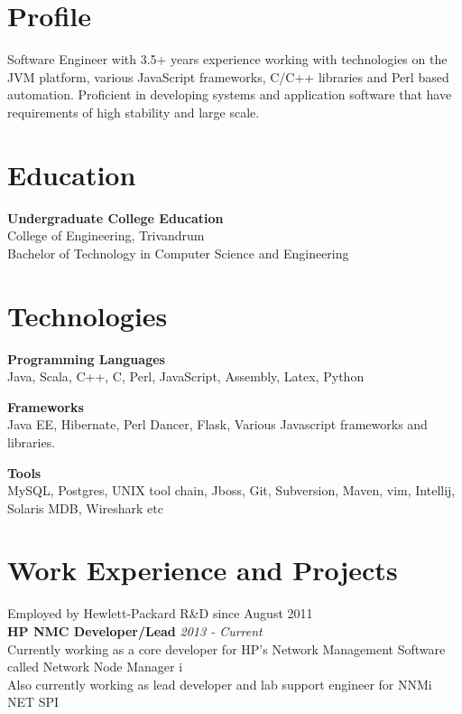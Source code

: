 \documentclass[line,margin]{res}
\begin{document}


\address{joji\_antony@gmx.com}
\address{+91 96323 41954}

\begin{resume}

\section{Profile}
Software Engineer with 3.5+ years experience working with technologies on the JVM platform, various JavaScript frameworks, C/C++ libraries and Perl based automation. Proficient in developing systems and application software that have requirements of high stability and large scale.

\section{Education}
{\bf Undergraduate College Education}\\
College of Engineering, Trivandrum\\
Bachelor of Technology in Computer Science and Engineering\\

\section{Technologies}

{\bf Programming Languages}\\
Java, Scala, C++, C, Perl, JavaScript, Assembly, Latex, Python

{\bf Frameworks}\\
Java EE, Hibernate, Perl Dancer, Flask, Various Javascript frameworks and libraries.

{\bf Tools}\\
MySQL, Postgres, UNIX tool chain, Jboss, Git, Subversion, Maven, vim, Intellij, Solaris MDB, Wireshark etc


\section{Work Experience and Projects}

Employed by Hewlett-Packard R\&D since August 2011\\

{\bf HP NMC Developer/Lead} \hfill {\it{2013 - Current}}\\
Currently working as a core developer for HP's Network Management Software called Network Node Manager i\\
Also currently working as lead developer and lab support engineer for NNMi NET SPI\\


\end{resume}
\end{document}
